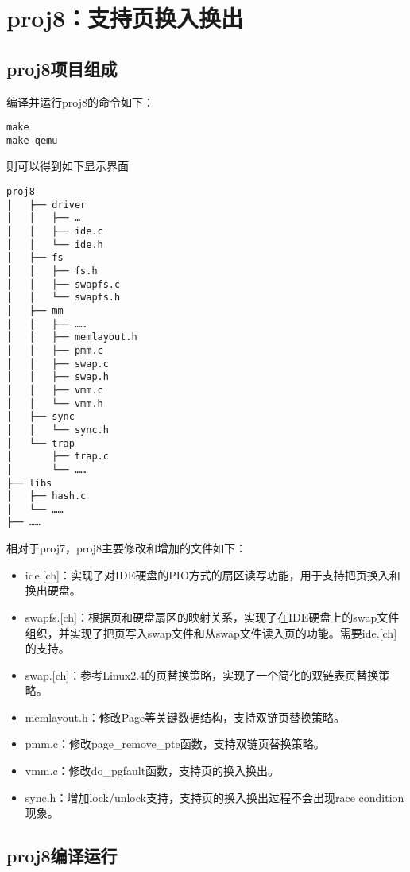 \section{proj8：支持页换入换出}\label{proj8ux652fux6301ux9875ux6362ux5165ux6362ux51fa}

\subsection{proj8项目组成}\label{proj8ux9879ux76eeux7ec4ux6210}

编译并运行proj8的命令如下：

\begin{lstlisting}
make
make qemu
\end{lstlisting}

则可以得到如下显示界面

\begin{lstlisting}
proj8
│   ├── driver
│   │   ├── …
│   │   ├── ide.c
│   │   └── ide.h
│   ├── fs
│   │   ├── fs.h
│   │   ├── swapfs.c
│   │   └── swapfs.h
│   ├── mm
│   │   ├── ……
│   │   ├── memlayout.h
│   │   ├── pmm.c
│   │   ├── swap.c
│   │   ├── swap.h
│   │   ├── vmm.c
│   │   └── vmm.h
│   ├── sync
│   │   └── sync.h
│   └── trap
│       ├── trap.c
│       └── ……
├── libs
│   ├── hash.c
│   └── ……
├── ……
\end{lstlisting}

相对于proj7，proj8主要修改和增加的文件如下：

\begin{itemize}
\item
  ide.{[}ch{]}：实现了对IDE硬盘的PIO方式的扇区读写功能，用于支持把页换入和换出硬盘。
\item
  swapfs.{[}ch{]}：根据页和硬盘扇区的映射关系，实现了在IDE硬盘上的swap文件组织，并实现了把页写入swap文件和从swap文件读入页的功能。需要ide.{[}ch{]}的支持。
\item
  swap.{[}ch{]}：参考Linux2.4的页替换策略，实现了一个简化的双链表页替换策略。
\item
  memlayout.h：修改Page等关键数据结构，支持双链页替换策略。
\item
  pmm.c：修改page\_remove\_pte函数，支持双链页替换策略。
\item
  vmm.c：修改do\_pgfault函数，支持页的换入换出。
\item
  sync.h：增加lock/unlock支持，支持页的换入换出过程不会出现race
  condition现象。
\end{itemize}

\subsection{proj8编译运行}\label{proj8ux7f16ux8bd1ux8fd0ux884c}

